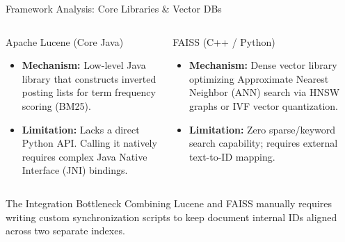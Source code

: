 \documentclass[aspectratio=169]{beamer}
\begin{document}
\begin{frame}{Framework Analysis: Core Libraries \& Vector DBs}
  \begin{columns}
    \begin{block}{Apache Lucene (Core Java)}
      \begin{itemize}
        \item \textbf{Mechanism:} Low-level Java library that constructs inverted posting lists for term frequency scoring (BM25).
        \item \textbf{Limitation:} Lacks a direct Python API. Calling it natively requires complex Java Native Interface (JNI) bindings.
      \end{itemize}
    \end{block}

    \begin{block}{FAISS (C++ / Python)}
      \begin{itemize}
        \item \textbf{Mechanism:} Dense vector library optimizing Approximate Nearest Neighbor (ANN) search via HNSW graphs or IVF vector quantization.
        \item \textbf{Limitation:} Zero sparse/keyword search capability; requires external text-to-ID mapping.
      \end{itemize}
    \end{block}
  \end{columns}

  \vspace{0.3cm}
  \begin{alertblock}{The Integration Bottleneck}
    Combining Lucene and FAISS manually requires writing custom synchronization scripts to keep document internal IDs aligned across two separate indexes.
  \end{alertblock}
\end{frame}
\end{document}
